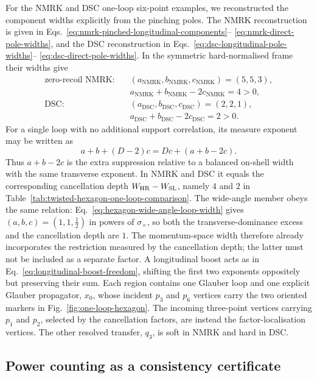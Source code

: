 \documentclass[a4paper,11pt]{article}
\newcommand{\WSL}{W_{\rm SL}}
\newcommand{\WHR}{W_{\rm HR}}
\begin{document}
For the NMRK and DSC one-loop six-point examples, we reconstructed the
component widths explicitly from the pinching poles.  The NMRK reconstruction
is given in Eqs.~\eqref{eq:nmrk-pinched-longitudinal-components}--
\eqref{eq:nmrk-direct-pole-widths}, and the DSC reconstruction in
Eqs.~\eqref{eq:dsc-longitudinal-pole-widths}--
\eqref{eq:dsc-direct-pole-widths}.  In the symmetric hard-normalised frame
their widths give
\begin{align}
 \text{zero-recoil NMRK}:\quad
 &(a_{\mathrm{NMRK}},b_{\mathrm{NMRK}},c_{\mathrm{NMRK}})=(5,5,3),
 \nonumber\\
 &a_{\mathrm{NMRK}}+b_{\mathrm{NMRK}}
   -2c_{\mathrm{NMRK}}=4>0,\nonumber\\[1mm]
 \text{DSC}:\quad
 &(a_{\mathrm{DSC}},b_{\mathrm{DSC}},c_{\mathrm{DSC}})=(2,2,1),
 \nonumber\\
 &a_{\mathrm{DSC}}+b_{\mathrm{DSC}}
   -2c_{\mathrm{DSC}}=2>0.
 \label{eq:six-point-glauber-summary}
\end{align}
For a single loop with no additional support correlation, its measure exponent
may be written as
\[
 a+b+(D-2)c=Dc+(a+b-2c).
\]
Thus \(a+b-2c\) is the extra suppression relative to a balanced on-shell
width with the same transverse exponent.  In NMRK and DSC it equals the
corresponding cancellation depth \(\WHR-\WSL\), namely \(4\) and \(2\) in
Table~\ref{tab:twisted-hexagon-one-loop-comparison}.  The wide-angle member
obeys the same relation: Eq.~\eqref{eq:hexagon-wide-angle-loop-width} gives
\((a,b,c)=(1,1,\tfrac12)\) in powers of \(\sigma_\times\), so both the
transverse-dominance excess and the cancellation depth are \(1\).  The
momentum-space width therefore already incorporates the restriction measured
by the cancellation depth; the latter must not be included as a separate
factor.
A longitudinal boost acts as in
Eq.~\eqref{eq:longitudinal-boost-freedom}, shifting the first two exponents
oppositely but preserving their sum.  Each region contains one Glauber loop
and one explicit Glauber propagator, \(x_0\), whose incident \(p_3\) and
\(p_6\) vertices carry the two oriented markers in
Fig.~\ref{fig:one-loop-hexagon}.  The incoming three-point vertices carrying
\(p_1\) and \(p_2\), selected by the cancellation factors, are instead the
factor-localisation vertices.  The other
resolved transfer, \(q_3\), is soft in NMRK and hard in DSC.

\subsection{Power counting as a consistency certificate}
\label{sec:power-counting-certificate}
\end{document}
